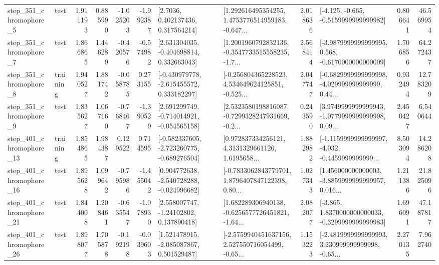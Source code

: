 \begin{tabular}{llrrrrllrlrr}
   step\_351\_chromophore\_5 &      test &      1.911193 &    0.885990 &     -1.025203 & -1.992387 &          [2.7036, 0.402137436, 0.317564214] &  [1.292616495354255, 1.4753776514959183, -0.647... &       2.018636 &              [-4.125, -0.665, -0.5159999999999982] &            0.806641 &         46.569954 \\
   step\_351\_chromophore\_7 &      test &      1.866865 &    1.446289 &     -0.420576 & -0.574982 &    [2.631304035, -0.404698814, 0.332663043] &  [1.2001960792832136, -0.3547733515558235, -1.7... &       2.568414 &  [-3.9879999999999995, 0.568, -0.6170000000000009] &            1.706856 &         64.272437 \\
   step\_351\_chromophore\_8 &  training &      1.940527 &    1.881742 &     -0.058785 &  0.273155 &   [-0.430979778, -2.615455572, 0.333182297] &  [-0.256804365228523, 4.534649624125851, -0.525... &       2.047747 &  [-0.6829999999999998, -4.029999999999999, 0.44... &            0.932494 &         12.783209 \\
   step\_351\_chromophore\_9 &      test &      1.835627 &    1.067160 &     -0.768467 & -1.390529 &   [2.691299749, -0.714014921, -0.054565158] &  [2.5323580198816087, -0.7299328247931669, -0.2... &       0.243590 &  [3.9749999999999943, -1.0779999999999998, 0.09... &            2.450427 &          6.540644 \\
  step\_401\_chromophore\_13 &  training &      1.854865 &    1.984387 &      0.129522 &  0.714595 &  [-0.582337605, -2.723260775, -0.689276504] &  [0.972837334256121, 4.3131329661126, 1.6195658... &       1.882982 &  [-1.1159999999999997, -4.032, -0.4459999999999... &            8.503094 &         14.286208 \\
  step\_401\_chromophore\_16 &      test &      1.895628 &    1.099642 &     -0.795986 & -1.455042 &   [0.904772638, -2.540728288, -0.024996682] &  [-0.7833062843779701, 1.8796407847122398, 0.80... &       1.027343 &  [1.456000000000003, -3.8859999999999957, 0.016... &            1.211386 &         21.825096 \\
  step\_401\_chromophore\_21 &      test &      1.844008 &    1.208461 &     -0.635547 & -1.078930 &     [2.558007747, -1.24102802, 0.137890418] &  [1.682289306940138, -0.6256577726451821, -1.64... &       2.082077 &  [-3.865, 1.8370000000000033, -0.3299999999999983] &            1.696091 &         47.187817 \\
  step\_401\_chromophore\_26 &      test &      1.898077 &    1.705878 &     -0.192198 & -0.039603 &    [1.521478915, -2.085087867, 0.501529487] &  [-2.5759940451637156, 2.527550716054499, -0.65... &       1.153223 &  [-2.4819999999999993, 3.230999999999998, -0.65... &            2.270135 &          7.962740 \\

\end{tabular}

